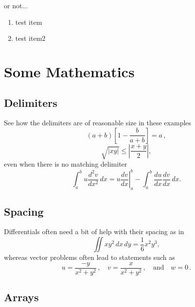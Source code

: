 \documentclass[9pt]{memoir}
\begin{document}
or not...
\begin{enumerate}
\item test item
\item test item2
\end{enumerate}


\section{Some Mathematics}

\subsection{Delimiters}

See how the delimiters are of reasonable size in these examples
\[
	\left(a+b\right)\left[1-\frac{b}{a+b}\right]=a\,,
\]
\[
	\sqrt{|xy|}\leq\left|\frac{x+y}{2}\right|,
\]
even when there is no matching delimiter
\[
	\int_a^bu\frac{d^2v}{dx^2}\,dx
	=\left.u\frac{dv}{dx}\right|_a^b
	-\int_a^b\frac{du}{dx}\frac{dv}{dx}\,dx.
\]

\subsection{Spacing}

Differentials often need a bit of help with their spacing as in
\[
	\iint xy^2\,dx\,dy 
	=\frac{1}{6}x^2y^3,
\]
whereas vector problems often lead to statements such as
\[
	u=\frac{-y}{x^2+y^2}\,,\quad
	v=\frac{x}{x^2+y^2}\,,\quad\text{and}\quad
	w=0\,.
\]

\subsection{Arrays}
\end{document}
